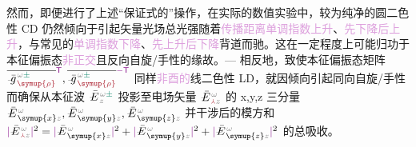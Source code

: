 然而，即便进行了上述“保证式的”操作，在实际的数值实验中，较为纯净的\textcolor{NavyBlue}{圆二色性 CD} 仍然倾向于引起\textcolor{PineGreen}{矢量光场}\textcolor{NavyBlue}{总光强}随着\textcolor{Plum}{传播距离}\textcolor{Plum}{单调指数上升}、\textcolor{Plum}{先下降后上升}，与常见的\textcolor{Plum}{单调指数下降}、\textcolor{Plum}{先上升后下降}背道而驰。这在一定程度上可能归功于\textcolor{PineGreen}{本征偏振态}\textcolor{Plum}{非正交}且\textcolor{NavyBlue}{反向自旋}/\textcolor{NavyBlue}{手性}的缘故。--- 相反地，致使\textcolor{PineGreen}{本征偏振态矩阵} $\overline{\xint{{}^{}_{\mathcolor{gray}{-}}}{10}{\bar{g}}^{\;\!\mathcolor{gray}{\omega} \textcolor{PineGreen}{\pm}}_{\;\! \textcolor{Maroon}{\symup{\rho}}}}^{\mathsf{\textcolor{Plum}{T}}}, \overline{\xint{{}^{}_{\mathcolor{gray}{-}}}{10}{\bar{g}}^{\;\!\mathcolor{gray}{\omega} \textcolor{PineGreen}{\pm}}_{\;\! \textcolor{Maroon}{\symup{\rho}}}}^{\textcolor{Plum}{-\mathsf{T}}}$ 同样\textcolor{Plum}{非酉的}\textcolor{NavyBlue}{线二色性 LD}，就因倾向引起\textcolor{NavyBlue}{同向自旋}/\textcolor{NavyBlue}{手性}而确保从\textcolor{PineGreen}{本征波} $\xint{\mathcolor{gray}{-}}{25}{\bar{E}}^{\;\!\mathcolor{gray}{\omega} \textcolor{PineGreen}{\pm}}_{\;\! \mathcolor{gray}{z}}$ 投影至电场矢量 $\xint{\mathcolor{gray}{-}}{25}{\bar{E}}^{\;\!\mathcolor{gray}{\omega}}_{\;\! \textcolor{Maroon}{\Yup} \mathcolor{gray}{z}}$ 的 x,y,z 三分量 $\xint{\mathcolor{gray}{-}}{25}{\bar{E}}^{\;\!\mathcolor{gray}{\omega}}_{\;\! \symup{x} \mathcolor{gray}{z}}, \xint{\mathcolor{gray}{-}}{25}{\bar{E}}^{\;\!\mathcolor{gray}{\omega}}_{\;\! \symup{y} \mathcolor{gray}{z}}, \xint{\mathcolor{gray}{-}}{25}{\bar{E}}^{\;\!\mathcolor{gray}{\omega}}_{\;\! \symup{z} \mathcolor{gray}{z}}$ 并\textcolor{PineGreen}{干涉}后的模方和 $\textcolor{Plum}{\lvert} \xint{\mathcolor{gray}{-}}{25}{\bar{E}}^{\;\!\mathcolor{gray}{\omega}}_{\;\! \textcolor{Maroon}{\Yup} \mathcolor{gray}{z}} \textcolor{Plum}{\rvert}^2 = \textcolor{Plum}{\lvert} \xint{\mathcolor{gray}{-}}{25}{\bar{E}}^{\;\!\mathcolor{gray}{\omega}}_{\;\! \symup{x} \mathcolor{gray}{z}} \textcolor{Plum}{\rvert}^2 + \textcolor{Plum}{\lvert} \xint{\mathcolor{gray}{-}}{25}{\bar{E}}^{\;\!\mathcolor{gray}{\omega}}_{\;\! \symup{y} \mathcolor{gray}{z}} \textcolor{Plum}{\rvert}^2 + \textcolor{Plum}{\lvert} \xint{\mathcolor{gray}{-}}{25}{\bar{E}}^{\;\!\mathcolor{gray}{\omega}}_{\;\! \symup{z} \mathcolor{gray}{z}} \textcolor{Plum}{\rvert}^2$ 的总\textcolor{NavyBlue}{吸收}。

\clearpage

\vspace*{-7.5em}


